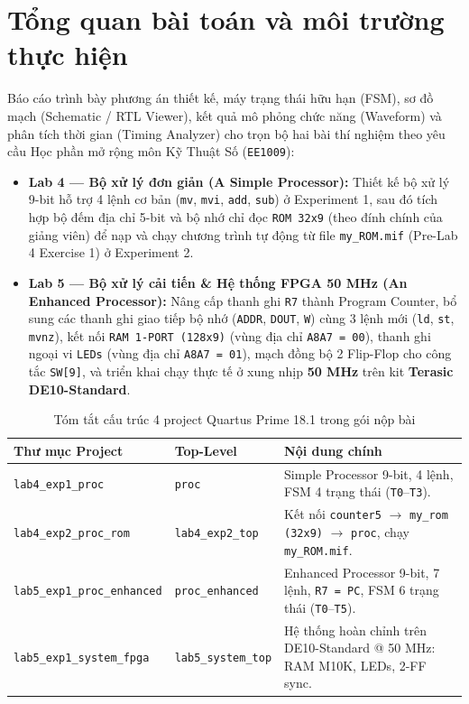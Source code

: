 \documentclass[11pt,a4paper]{article}
\newcommand{\code}[1]{\texttt{\small #1}}
\begin{document}
\section{Tổng quan bài toán và môi trường thực hiện}
Báo cáo trình bày phương án thiết kế, máy trạng thái hữu hạn (FSM), sơ đồ mạch (Schematic / RTL Viewer), kết quả mô phỏng chức năng (Waveform) và phân tích thời gian (Timing Analyzer) cho trọn bộ hai bài thí nghiệm theo yêu cầu Học phần mở rộng môn Kỹ Thuật Số (\code{EE1009}):
\begin{itemize}
  \item \textbf{Lab 4 --- Bộ xử lý đơn giản (A Simple Processor):} Thiết kế bộ xử lý 9-bit hỗ trợ 4 lệnh cơ bản (\code{mv}, \code{mvi}, \code{add}, \code{sub}) ở Experiment 1, sau đó tích hợp bộ đếm địa chỉ 5-bit và bộ nhớ chỉ đọc \code{ROM 32x9} (theo đính chính của giảng viên) để nạp và chạy chương trình tự động từ file \code{my\_ROM.mif} (Pre-Lab 4 Exercise 1) ở Experiment 2.
  \item \textbf{Lab 5 --- Bộ xử lý cải tiến \& Hệ thống FPGA 50 MHz (An Enhanced Processor):} Nâng cấp thanh ghi \code{R7} thành Program Counter, bổ sung các thanh ghi giao tiếp bộ nhớ (\code{ADDR}, \code{DOUT}, \code{W}) cùng 3 lệnh mới (\code{ld}, \code{st}, \code{mvnz}), kết nối \code{RAM 1-PORT (128x9)} (vùng địa chỉ \code{A8A7 = 00}), thanh ghi ngoại vi \code{LEDs} (vùng địa chỉ \code{A8A7 = 01}), mạch đồng bộ 2 Flip-Flop cho công tắc \code{SW[9]}, và triển khai chạy thực tế ở xung nhịp \textbf{50 MHz} trên kit \textbf{Terasic DE10-Standard}.
\end{itemize}

\begin{table}[H]
  \centering
  \caption{Tóm tắt cấu trúc 4 project Quartus Prime 18.1 trong gói nộp bài}
  \label{tab:overview}
  \small
  \renewcommand{\arraystretch}{1.15}
  \begin{tabularx}{\linewidth}{@{}l l X@{}}
    \toprule
    \textbf{Thư mục Project} & \textbf{Top-Level} & \textbf{Nội dung chính} \\
    \midrule
    \code{lab4\_exp1\_proc} & \code{proc} & Simple Processor 9-bit, 4 lệnh, FSM 4 trạng thái (\code{T0}--\code{T3}). \\
    \code{lab4\_exp2\_proc\_rom} & \code{lab4\_exp2\_top} & Kết nối \code{counter5} $\rightarrow$ \code{my\_rom (32x9)} $\rightarrow$ \code{proc}, chạy \code{my\_ROM.mif}. \\
    \code{lab5\_exp1\_proc\_enhanced} & \code{proc\_enhanced} & Enhanced Processor 9-bit, 7 lệnh, \code{R7 = PC}, FSM 6 trạng thái (\code{T0}--\code{T5}). \\
    \code{lab5\_exp1\_system\_fpga} & \code{lab5\_system\_top} & Hệ thống hoàn chỉnh trên DE10-Standard @ 50 MHz: RAM M10K, LEDs, 2-FF sync. \\
    \bottomrule
  \end{tabularx}
\end{table}
\end{document}
